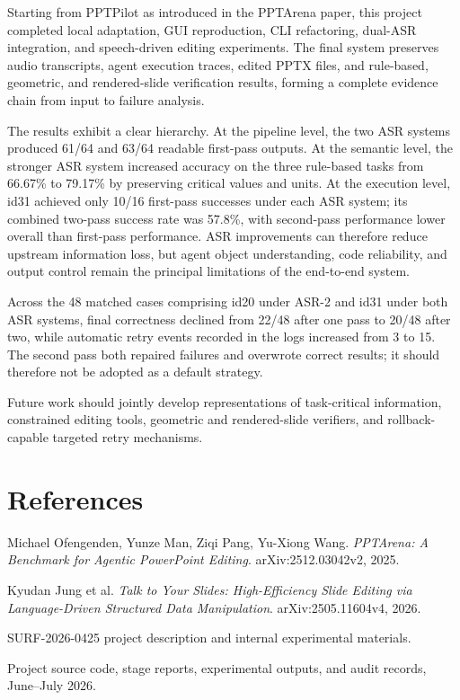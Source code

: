 \documentclass[11pt,a4paper,UTF8,fontset=fandol]{ctexart}
\begin{document}
Starting from PPTPilot as introduced in the PPTArena paper, this project completed local adaptation, GUI reproduction, CLI refactoring, dual-ASR integration, and speech-driven editing experiments. The final system preserves audio transcripts, agent execution traces, edited PPTX files, and rule-based, geometric, and rendered-slide verification results, forming a complete evidence chain from input to failure analysis.

The results exhibit a clear hierarchy. At the pipeline level, the two ASR systems produced 61/64 and 63/64 readable first-pass outputs. At the semantic level, the stronger ASR system increased accuracy on the three rule-based tasks from 66.67\% to 79.17\% by preserving critical values and units. At the execution level, id31 achieved only 10/16 first-pass successes under each ASR system; its combined two-pass success rate was 57.8\%, with second-pass performance lower overall than first-pass performance. ASR improvements can therefore reduce upstream information loss, but agent object understanding, code reliability, and output control remain the principal limitations of the end-to-end system.

Across the 48 matched cases comprising id20 under ASR-2 and id31 under both ASR systems, final correctness declined from 22/48 after one pass to 20/48 after two, while automatic retry events recorded in the logs increased from 3 to 15. The second pass both repaired failures and overwrote correct results; it should therefore not be adopted as a default strategy.

Future work should jointly develop representations of task-critical information, constrained editing tools, geometric and rendered-slide verifiers, and rollback-capable targeted retry mechanisms.

\section*{References}

\begin{enumerate}[label={[\arabic*]},leftmargin=2.5em]
  \item Michael Ofengenden, Yunze Man, Ziqi Pang, Yu-Xiong Wang. \textit{PPTArena: A Benchmark for Agentic PowerPoint Editing}. arXiv:2512.03042v2, 2025.
  \item Kyudan Jung et al. \textit{Talk to Your Slides: High-Efficiency Slide Editing via Language-Driven Structured Data Manipulation}. arXiv:2505.11604v4, 2026.
  \item SURF-2026-0425 project description and internal experimental materials.
  \item Project source code, stage reports, experimental outputs, and audit records, June--July 2026.
\end{enumerate}
\end{document}
